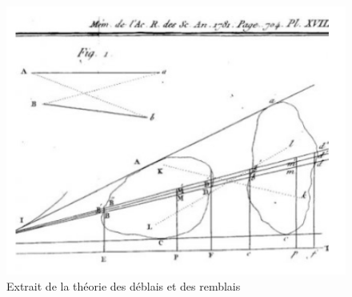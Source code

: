 \documentclass{beamer}
\theoremstyle{definition}
\begin{document}
\begin{frame}
\begin{minipage}[t]{1\linewidth}
\begin{minipage}{0.43\linewidth}
\begin{figure}
			\includegraphics[scale=0.35]{sable.png}			
			\caption*{Extrait de la théorie des déblais et des remblais}
		\end{figure}\end{minipage}
	\end{minipage}
\end{frame}
\end{document}
